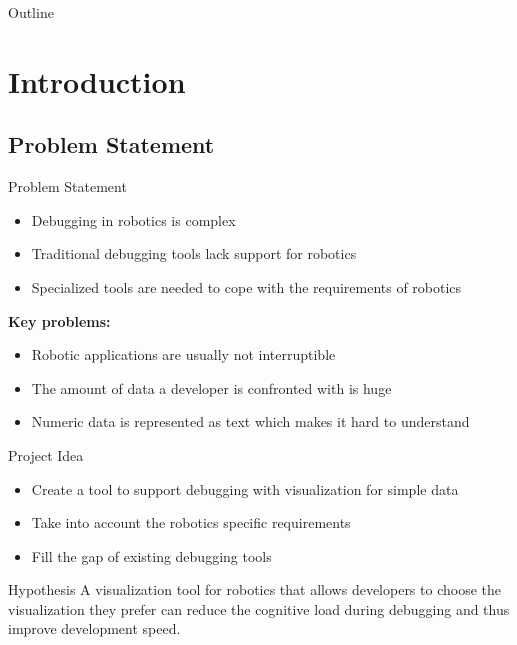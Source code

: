 \documentclass[compress]{beamer}
\title[Visual Debugging for Robotics]
{A flexible visual framework\\ \strut for debugging complex robotic systems}
\subtitle{\scriptsize{Masters's Thesis in the Software Engineering Elite Graduate Program}}
\author[Felix Kaser]{Felix Kaser\\\tiny{\texttt{kaserf@in.tum.de}}}
\date{October 3, 2012}
\begin{document}
\begin{frame}[plain]
\titlepage
\end{frame}

\begin{frame}{Outline}
\tableofcontents
\end{frame}

\section{Introduction}
\subsection{Problem Statement}

\begin{frame}{Problem Statement}
\begin{itemize}
\item Debugging in robotics is complex
\item Traditional debugging tools lack support for robotics
\item Specialized tools are needed to cope with the requirements of robotics
\end{itemize}
\pause
\textbf{Key problems:}
\begin{itemize}
\item Robotic applications are usually not interruptible
\item The amount of data a developer is confronted with is huge
\item Numeric data is represented as text which makes it hard to understand
\end{itemize}
\end{frame}

\begin{frame}{Project Idea}
\begin{itemize}
\item Create a tool to support debugging with visualization for simple data
\item Take into account the robotics specific requirements
\item Fill the gap of existing debugging tools
\end{itemize}
\pause
\begin{block}{Hypothesis}
A visualization tool for robotics that allows developers to choose the visualization they prefer can reduce the cognitive load during debugging and thus improve development speed.
\end{block}
\end{frame}
\end{document}
